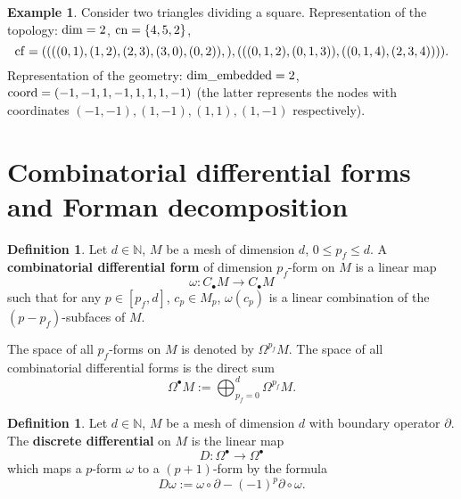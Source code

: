 \documentclass[fleqn]{article}
\theoremstyle{definition}
\newtheorem{definition}[theorem]{Definition}
\newtheorem{example}[theorem]{Example}
\begin{document}
\begin{example}
  Consider two triangles dividing a square.
  Representation of the topology: ${\rm dim} = 2$, ${\rm cn} = \{4, 5, 2\}$,
  \begin{equation}
    {\rm cf} =
    (
      (
        ((0, 1), (1, 2), (2, 3), (3, 0), (0, 2)),
      ),
      (
        ((0, 1, 2), (0, 1, 3)),
        ((0, 1, 4), (2, 3, 4))
      )
    ).
  \end{equation}
  Representation of the geometry: ${\rm dim\_embedded} = 2$,
  ${\rm coord} = (-1, -1, 1, -1, 1, 1, 1, -1)$
  (the latter represents the nodes with coordinates
  $(-1, -1), (1, -1), (1, 1), (1, -1)$ respectively).
\end{example}

\section{Combinatorial differential forms and Forman decomposition}

\begin{definition}
  Let $d \in \mathbb{N}$, $M$ be a mesh of dimension $d$, $0 \leq p_f \leq d$.
  A \textbf{combinatorial differential form} of dimension $p_f$-form on $M$
  is a linear map
  \begin{equation}
    \omega \colon C_\bullet M \to C_\bullet M
  \end{equation}
  such that for any $p \in [p_f, d]$, $c_p \in M_p$, $\omega(c_p)$ is a linear
  combination of the $(p - p_f)$-subfaces of $M$.

  The space of all $p_f$-forms on $M$ is denoted by $\Omega^{p_f} M$.
  The space of all combinatorial differential forms is the direct sum
  \begin{equation}
    \Omega^\bullet M := \bigoplus_{p_f = 0}^{d} \Omega^{p_f} M.
  \end{equation}
\end{definition}

\begin{definition}
  Let $d \in \mathbb{N}$, $M$ be a mesh of dimension $d$ with boundary operator
  $\partial$.
  The \textbf{discrete differential} on $M$ is the linear map
  \begin{equation}
    D \colon \Omega^\bullet \to \Omega^\bullet
  \end{equation}
  which maps a $p$-form $\omega$ to a $(p + 1)$-form by the formula
  \begin{equation}
    D \omega := \omega \circ \partial - (-1)^p \partial \circ \omega.
  \end{equation}
\end{definition}
\end{document}
